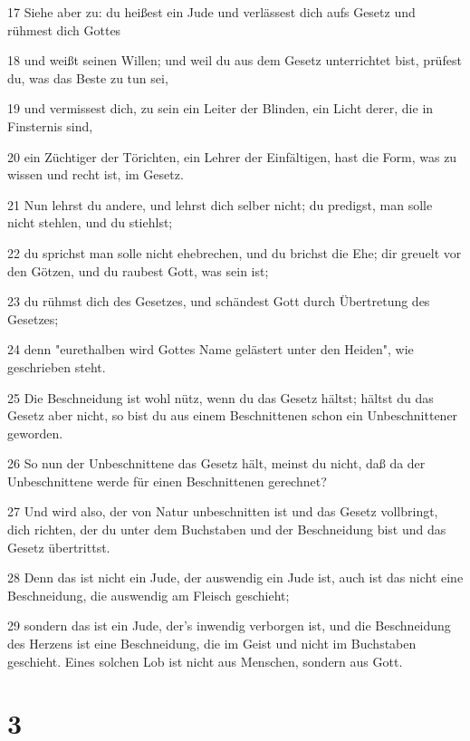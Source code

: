 \par 17 Siehe aber zu: du heißest ein Jude und verlässest dich aufs Gesetz und rühmest dich Gottes
\par 18 und weißt seinen Willen; und weil du aus dem Gesetz unterrichtet bist, prüfest du, was das Beste zu tun sei,
\par 19 und vermissest dich, zu sein ein Leiter der Blinden, ein Licht derer, die in Finsternis sind,
\par 20 ein Züchtiger der Törichten, ein Lehrer der Einfältigen, hast die Form, was zu wissen und recht ist, im Gesetz.
\par 21 Nun lehrst du andere, und lehrst dich selber nicht; du predigst, man solle nicht stehlen, und du stiehlst;
\par 22 du sprichst man solle nicht ehebrechen, und du brichst die Ehe; dir greuelt vor den Götzen, und du raubest Gott, was sein ist;
\par 23 du rühmst dich des Gesetzes, und schändest Gott durch Übertretung des Gesetzes;
\par 24 denn "eurethalben wird Gottes Name gelästert unter den Heiden", wie geschrieben steht.
\par 25 Die Beschneidung ist wohl nütz, wenn du das Gesetz hältst; hältst du das Gesetz aber nicht, so bist du aus einem Beschnittenen schon ein Unbeschnittener geworden.
\par 26 So nun der Unbeschnittene das Gesetz hält, meinst du nicht, daß da der Unbeschnittene werde für einen Beschnittenen gerechnet?
\par 27 Und wird also, der von Natur unbeschnitten ist und das Gesetz vollbringt, dich richten, der du unter dem Buchstaben und der Beschneidung bist und das Gesetz übertrittst.
\par 28 Denn das ist nicht ein Jude, der auswendig ein Jude ist, auch ist das nicht eine Beschneidung, die auswendig am Fleisch geschieht;
\par 29 sondern das ist ein Jude, der's inwendig verborgen ist, und die Beschneidung des Herzens ist eine Beschneidung, die im Geist und nicht im Buchstaben geschieht. Eines solchen Lob ist nicht aus Menschen, sondern aus Gott.

\chapter{3}

